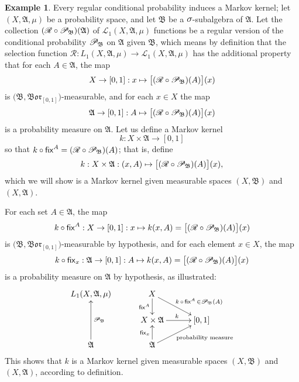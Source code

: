 \documentclass[
twoside=true,
paper=letter,
fontsize=9pt,
pagesize=auto,
leqno,
openany,
headsepline,
overfullrule,
]{scrbook}
\theoremstyle{plain}
\theoremstyle{plain}
\theoremstyle{definition}
\newtheorem{example}[thm]{Example}
\theoremstyle{bfnoteitalic}
\theoremstyle{bfnoteroman}
\newcommand{\sigalg}[1]{\mathfrak{#1}}
\newcommand{\cali}[1]{\mathscr{#1}}
\newcommand{\sfop}[1]{\mathsf{#1}}
\newcommand{\condprobop}[1]{\mathop{\cali{P}\hspace{-1pt}}\nolimits_{#1}}
\newcommand{\borel}{\mathfrak{Bor}}
\newcommand{\textsigma}{\hbox{\large{$\sigma$}}\kern-1pt}
\newcommand{\sigmaalgebra}{\sigalg{A}}
\newcommand{\sigmaalgebraii}{\sigalg{B}}
\newcommand{\Lone}{L_1(\measurespace, \sigmaalgebra, \measure)}
\newcommand{\caliLone}{\cali{L}_1(\measurespace, \sigmaalgebra, \measure)}
\newcommand{\measurespace}{X}
\newcommand{\mspaceelt}{x}
\newcommand{\measure}{\mu}
\newcommand{\seti}{A}
\newcommand{\regular}{\cali{R}}
\newcommand{\markovkernel}{k}
\newcommand{\fixinthefirst}[1]{\sfop{fix}_{#1}}
\newcommand{\fixinthesecond}[1]{\sfop{fix}^{#1}}
\begin{document}
\begin{example}\label{regular_conditional_probability_induces_markov_kernel}
Every regular conditional probability induces a Markov kernel;
let $(\measurespace,\sigmaalgebra,\measure)$ be a probability space, and let $\sigmaalgebraii$ be a $\textsigma$-subalgebra of $\sigmaalgebra$.
Let the collection 
$(\regular\circ\condprobop{\sigmaalgebraii})(\sigmaalgebra)$ 
of 
$\caliLone$ functions
be a regular version of the conditional probability $\condprobop{\sigmaalgebraii}$ on $\sigmaalgebra$ given $\sigmaalgebraii$, which means by definition that the selection function 
$\regular:\Lone\to\caliLone$
has the additional property that for each $\seti\in\sigmaalgebra$, the map 
\[
\measurespace\to [0,1] : \mspaceelt\mapsto
\bigl[ (\regular\circ\condprobop{\sigmaalgebraii}) (\seti)\bigr](\mspaceelt)
\]
is $\bigl(\sigmaalgebraii, \borel_{[0,1]}\bigr)$\hyp{}measurable, and for each 
$\mspaceelt\in\measurespace$ the map
\[
\sigmaalgebra\to [0,1]: \seti \mapsto 
\bigl[ (\regular\circ\condprobop{\sigmaalgebraii}) (\seti)\bigr](\mspaceelt)
\]
is a probability measure on $\sigmaalgebra$.
Let us define a Markov kernel
\[
\markovkernel : \measurespace\times\sigmaalgebra \to [0,1]
\]
so that
$\markovkernel \circ\fixinthesecond{\seti}
=
(\regular\circ\condprobop{\sigmaalgebraii}) (\seti)$;
that is, define
\[
\markovkernel : \measurespace\times\sigmaalgebra
: (\mspaceelt,\seti)\mapsto  
\bigl[ (\regular\circ\condprobop{\sigmaalgebraii}) (\seti)\bigr](\mspaceelt),
\]
which we will show is a Markov kernel given measurable spaces $(\measurespace,\sigmaalgebraii)$ and $(\measurespace, \sigmaalgebra)$.

For each set $\seti\in\sigmaalgebra$, the map
\[
\markovkernel\circ\fixinthesecond{\seti}
: \measurespace\to [0,1]
: \mspaceelt\mapsto \markovkernel(\mspaceelt, \seti)
= 
\bigl[ (\regular\circ\condprobop{\sigmaalgebraii}) (\seti)\bigr](\mspaceelt)
\]
is  $\bigl(\sigmaalgebraii, \borel_{[0,1]}\bigr)$\hyp{}measurable by hypothesis, and for each element $\mspaceelt\in\measurespace$, the map
\[
\markovkernel\circ\fixinthefirst{\mspaceelt}
: \sigmaalgebra\to [0,1]
: \seti\mapsto
\markovkernel(\mspaceelt, \seti)
=
\bigl[ (\regular\circ\condprobop{\sigmaalgebraii}) (\seti)\bigr](\mspaceelt)
\]
is a probability measure on
$\sigmaalgebra$ by hypothesis, as illustrated:
\[
\xymatrix@R=16pt@C=30pt{ 
\Lone &
\measurespace \ar[d]_-{\fixinthesecond{\seti}} 
\ar[dr]^{\ \quad\markovkernel\,\circ\,\fixinthesecond{\seti}\,
\in
\condprobop{\sigmaalgebraii}(\seti)}
\\
&\measurespace\times\sigmaalgebra \ar[r]^{\markovkernel} & [0,1] 
\\
\sigmaalgebra \ar[uu]_{\condprobop{\sigmaalgebraii}} & \sigmaalgebra
\ar[ur]_{\qquad\text{probability measure}} \ar[u]^{\fixinthefirst{\mspaceelt}} & 
\\
}
\]
This shows that $\markovkernel$ is a Markov kernel given measurable spaces $(\measurespace,\sigmaalgebraii)$ and $(\measurespace, \sigmaalgebra)$, according to definition. 
\end{example}
\end{document}
